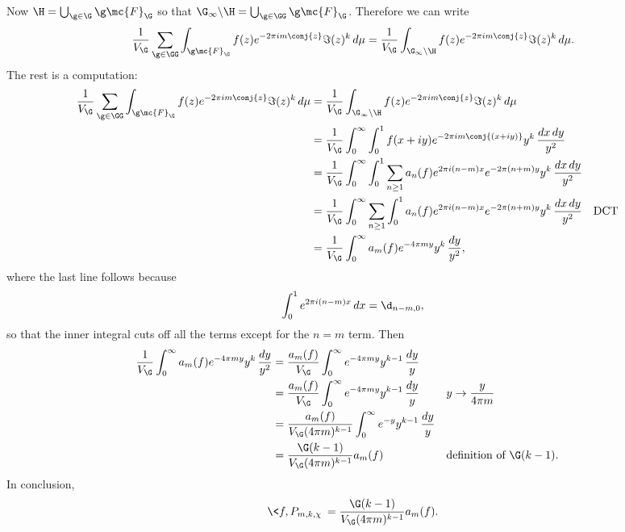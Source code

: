     Now $\H = \bigcup_{\g \in \G}\g\mc{F}_{\G}$ so that $\G_{\infty}\backslash\H = \bigcup_{\g \in \GG}\g\mc{F}_{\G}$. Therefore we can write
    \[
      \frac{1}{V_{\G}}\sum_{\g \in \GG}\int_{\g\mc{F}_{\G}}f(z)e^{-2\pi im\conj{z}}\Im(z)^{k}\,d\mu = \frac{1}{V_{\G}}\int_{\G_{\infty}\backslash\H}f(z)e^{-2\pi im\conj{z}}\Im(z)^{k}\,d\mu.
    \]
    The rest is a computation:
    \begin{align*}
      \frac{1}{V_{\G}}\sum_{\g \in \GG}\int_{\g\mc{F}_{\G}}f(z)e^{-2\pi im\conj{z}}\Im(z)^{k}\,d\mu &= \frac{1}{V_{\G}}\int_{\G_{\infty}\backslash\H}f(z)e^{-2\pi im\conj{z}}\Im(z)^{k}\,d\mu \\
      &= \frac{1}{V_{\G}}\int_{0}^{\infty}\int_{0}^{1}f(x+iy)e^{-2\pi im\conj{(x+iy)}}y^{k}\,\frac{dx\,dy}{y^{2}} \\
      &= \frac{1}{V_{\G}}\int_{0}^{\infty}\int_{0}^{1}\sum_{n \ge 1}a_{n}(f)e^{2\pi i(n-m)x}e^{-2\pi(n+m)y}y^{k}\,\frac{dx\,dy}{y^{2}} \\
      &= \frac{1}{V_{\G}}\int_{0}^{\infty}\sum_{n \ge 1}\int_{0}^{1}a_{n}(f)e^{2\pi i(n-m)x}e^{-2\pi(n+m)y}y^{k}\,\frac{dx\,dy}{y^{2}} && \text{DCT} \\
      &= \frac{1}{V_{\G}}\int_{0}^{\infty}a_{m}(f)e^{-4\pi my}y^{k}\,\frac{dy}{y^{2}},
    \end{align*}
    where the last line follows because
    \begin{equation}\label{equ:Dirac_integral_representation}
      \int_{0}^{1}e^{2\pi i(n-m)x}\,dx = \d_{n-m,0},
    \end{equation}
    so that the inner integral cuts off all the terms except for the $n = m$ term. Then
    \begin{align*}
      \frac{1}{V_{\G}}\int_{0}^{\infty}a_{m}(f)e^{-4\pi my}y^{k}\,\frac{dy}{y^{2}} &= \frac{a_{m}(f)}{V_{\G}}\int_{0}^{\infty}e^{-4\pi my}y^{k-1}\,\frac{dy}{y} \\
      &= \frac{a_{m}(f)}{V_{\G}}\int_{0}^{\infty}e^{-4\pi my}y^{k-1}\,\frac{dy}{y} && \text{$y \to \frac{y}{4\pi m}$} \\
      &= \frac{a_{m}(f)}{V_{\G}(4\pi m)^{k-1}}\int_{0}^{\infty}e^{-y}y^{k-1}\,\frac{dy}{y} \\
      &= \frac{\G(k-1)}{V_{\G}(4\pi m)^{k-1}}a_{m}(f) && \text{definition of $\G(k-1)$.}
    \end{align*}
    In conclusion,
    \begin{equation}\label{equ:Petersson_inner_product_with_Poincare_series}
      \<f,P_{m,k,\chi}\> = \frac{\G(k-1)}{V_{\G}(4\pi m)^{k-1}}a_{m}(f).
    \end{equation}
